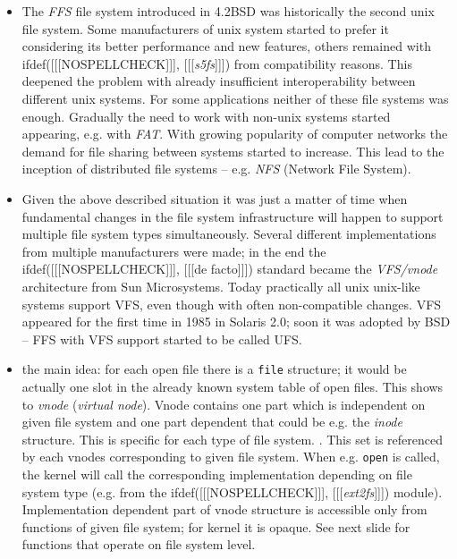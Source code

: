 \begin{itemize}
\item The \emph{FFS} file system introduced in 4.2BSD was historically the
second unix file system. Some manufacturers of unix system started to prefer it
considering its better performance and new features, others remained with
ifdef([[[NOSPELLCHECK]]], [[[\emph{s5fs}]]]) from compatibility reasons. This
deepened the problem with already insufficient interoperability between
different unix systems. For some
applications neither of these file systems was enough. Gradually the need to
work with non-unix systems started appearing, e.g. with \emph{FAT}. With growing
popularity of computer networks the demand for file sharing between systems
started to increase. This lead to the inception of distributed file systems
-- e.g. \emph{NFS} (Network File System).
\item Given the above described situation it was just a matter of time when
fundamental changes in the file system infrastructure will happen to support
multiple file system types simultaneously. Several different implementations
from multiple manufacturers were made; in the end the ifdef([[[NOSPELLCHECK]]],
[[[de facto]]]) standard became
the \emph{VFS/vnode} architecture from Sun Microsystems. Today practically all
unix u{}nix-like systems support VFS, even though with often non-compatible
changes. VFS appeared for the first time in 1985 in Solaris 2.0;
soon it was adopted by BSD -- FFS with VFS support started to be called UFS.
\item the main idea: for each open file there is a \texttt{file} structure;
it would be actually one slot in the already known system table of open files.
This shows to \emph{vnode} (\emph{virtual node}). Vnode contains one part which
is independent on given file system and one part dependent that could be e.g.
the \emph{inode} structure. This is specific for each type of file system.
. This set is referenced by each vnodes corresponding to given
file system.  When e.g.
\texttt{open} is called, the kernel will call the corresponding implementation
depending on file system type (e.g. from the ifdef([[[NOSPELLCHECK]]],
[[[\emph{ext2fs}]]]) module).
Implementation dependent part of vnode structure is accessible only from
functions of given file system; for kernel it is opaque. See next slide
for functions that operate on file system level.

\end{itemize}
